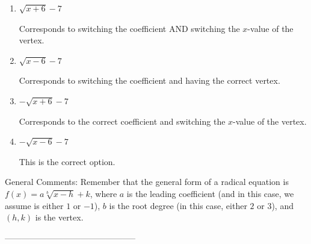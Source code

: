 \documentclass{article}[10pt]
\begin{document}
\begin{enumerate}[label=\Alph*.] 
\item $ \sqrt{x + 6} - 7 $ 

 Corresponds to switching the coefficient AND switching the $x$-value of the vertex. 
\item $ \sqrt{x - 6} - 7 $ 

 Corresponds to switching the coefficient and having the correct vertex. 
\item $ - \sqrt{x + 6} - 7 $ 

 Corresponds to the correct coefficient and switching the $x$-value of the vertex. 
\item $ - \sqrt{x - 6} - 7 $ 

 This is the correct option. 
\end{enumerate} 
 
General Comments: Remember that the general form of a radical equation is $ f(x) = a \sqrt[b]{x - h} + k$, where $a$ is the leading coefficient (and in this case, we assume is either $1$ or $-1$), $b$ is the root degree (in this case, either $2$ or $3$), and $(h, k)$ is the vertex.

-----------------------------------------------
\end{document}
